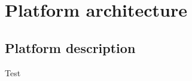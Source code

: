 \chapter{Platform architecture}\label{cha:PlatformArchitecture}

\section{Platform description}
\pagestyle{scrheadings}

Test
